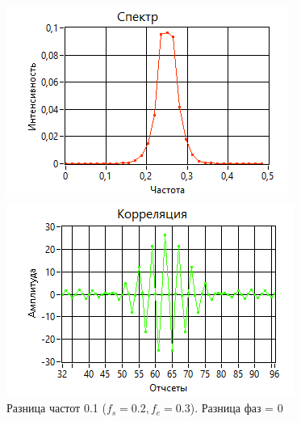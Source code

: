 \begin{figure}[H]
    \centering
    \begin{minipage}{0.49\linewidth}
        \includegraphics[width =0.9\linewidth]{imgs/spec3.png}
    \end{minipage}
    \begin{minipage}{0.49\linewidth}
        \includegraphics[width =0.9\linewidth]{imgs/corr3.png}
    \end{minipage}
	\caption{Разница частот 0.1 ($f_{s}=0.2, f_{e}=0.3$). Разница фаз = 0}
	\label{fig:spec3}
\end{figure}

